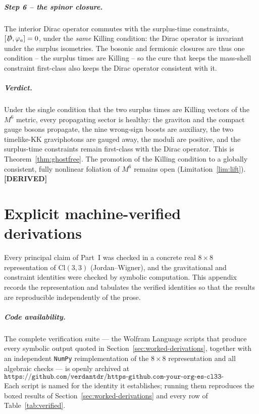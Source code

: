 \documentclass[11pt,oneside]{book}
\newcommand{\Cl}{\mathrm{Cl}}                     %
\newcommand{\Dirac}{\slashed{D}}
\newcommand{\status}[1]{{\sffamily\bfseries\color{statuscol}[#1]}}
\newcommand{\PLACEHOLDER}[1]{\textcolor{red}{\textbf{$\langle$#1$\rangle$}}}
\theoremstyle{plain}
\theoremstyle{definition}
\theoremstyle{remark}
\begin{document}
\paragraph{Step 6 -- the spinor closure.}
The interior Dirac operator commutes with the surplus-time constraints,
$[\Dirac,\varphi_a]=0$, under the \emph{same} Killing condition: the Dirac operator is invariant
under the surplus isometries. The bosonic and fermionic closures are thus one condition -- the
surplus times are Killing -- so the cure that keeps the mass-shell constraint first-class also
keeps the Dirac operator consistent with it.

\paragraph{Verdict.}
Under the single condition that the two surplus times are Killing vectors of the $M^6$ metric,
every propagating sector is healthy: the graviton and the compact gauge bosons propagate, the
nine wrong-sign boosts are auxiliary, the two timelike-KK graviphotons are gauged away, the
moduli are positive, and the surplus-time constraints remain first-class with the Dirac
operator. This is Theorem~\ref{thm:ghostfree}. The promotion of the Killing condition to a
globally consistent, fully nonlinear foliation of $M^6$ remains open
(Limitation~\ref{lim:lift}). \status{DERIVED}

\chapter{Explicit machine-verified derivations}
\label{app:derivations}

Every principal claim of Part~I was checked in a concrete real $8\times8$
representation of $\Cl(3,3)$ (Jordan--Wigner), and the gravitational and constraint
identities were checked by symbolic computation. This appendix records the
representation and tabulates the verified identities so that the results are
reproducible independently of the prose.

\paragraph{Code availability.}
The complete verification suite --- the Wolfram Language scripts that produce every
symbolic output quoted in Section~\ref{sec:worked-derivations}, together with an
independent \texttt{NumPy} reimplementation of the $8\times8$ representation and all
algebraic checks --- is openly archived at
\[
  \texttt{https://github.com/verdantdr/https-github.com-your-org-es-cl33-verification}
\]
Each script is named for the identity it establishes; running them reproduces the
boxed results of Section~\ref{sec:worked-derivations} and every row of
Table~\ref{tab:verified}.
\end{document}
